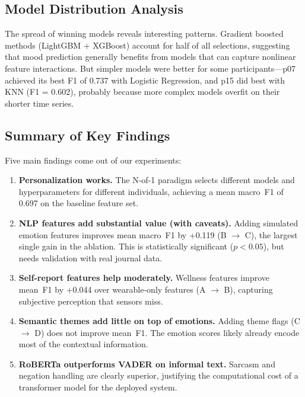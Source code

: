 \documentclass[conference]{IEEEtran}
\begin{document}
\subsection{Model Distribution Analysis}

The spread of winning models reveals interesting patterns. Gradient boosted methods (LightGBM + XGBoost) account for half of all selections, suggesting that mood prediction generally benefits from models that can capture nonlinear feature interactions. But simpler models were better for some participants---p07 achieved its best F1 of 0.737 with Logistic Regression, and p15 did best with KNN (F1 = 0.602), probably because more complex models overfit on their shorter time series.

\subsection{Summary of Key Findings}

Five main findings come out of our experiments:

\begin{enumerate}
    \item \textbf{Personalization works.} The N-of-1 paradigm selects different models and hyperparameters for different individuals, achieving a mean macro~F1 of 0.697 on the baseline feature set.

    \item \textbf{NLP features add substantial value (with caveats).} Adding simulated emotion features improves mean macro~F1 by +0.119 (B $\rightarrow$ C), the largest single gain in the ablation. This is statistically significant ($p < 0.05$), but needs validation with real journal data.

    \item \textbf{Self-report features help moderately.} Wellness features improve mean~F1 by +0.044 over wearable-only features (A $\rightarrow$ B), capturing subjective perception that sensors miss.

    \item \textbf{Semantic themes add little on top of emotions.} Adding theme flags (C $\rightarrow$ D) does not improve mean~F1. The emotion scores likely already encode most of the contextual information.

    \item \textbf{RoBERTa outperforms VADER on informal text.} Sarcasm and negation handling are clearly superior, justifying the computational cost of a transformer model for the deployed system.
\end{enumerate}
\end{document}
